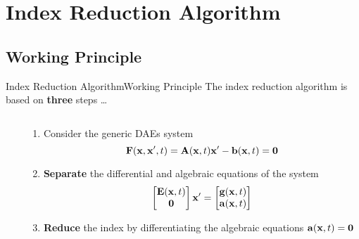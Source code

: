 
\section{Index Reduction Algorithm}

\subsection{Working Principle}

\begin{frame}{Index Reduction Algorithm}{Working Principle}
  The index reduction algorithm is based on \textbf{three} steps \dots
  \begin{columns}
    \begin{column}[c]{0.2\textwidth}
      \flushright
      \vspace{-1.25em}%
    \end{column}
    \begin{column}[c]{0.85\textwidth}
      \begin{enumerate}[<+->]
        \item Consider the generic \acsp{DAE} system
        \begin{equation*}
          \mathbf{F}(\mathbf{x}, \mathbf{x}^\prime, t) = \mathbf{A}(\mathbf{x}, t) \mathbf{x}^\prime - \mathbf{b}(\mathbf{x}, t) = \mathbf{0}
        \end{equation*}
        \item \textbf{Separate} the differential and algebraic equations of the system
        \begin{equation*}
          \begin{bmatrix} \mathbf{E}(\mathbf{x}, t) \\ \mathbf{0} \end{bmatrix} \mathbf{x}^\prime = \begin{bmatrix} \mathbf{g}(\mathbf{x}, t) \\ \mathbf{a}(\mathbf{x}, t) \end{bmatrix}
        \end{equation*}
        \item \textbf{Reduce} the index by differentiating the algebraic equations $\mathbf{a}(\mathbf{x}, t) = \mathbf{0}$
      \end{enumerate}
    \end{column}
  \end{columns}
  \vspace{0.75em}
\end{frame}

